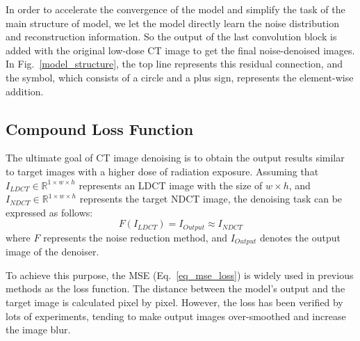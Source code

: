 \documentclass[conference]{IEEEtran}
\begin{document}
            In order to accelerate the convergence of the model and simplify the task of the main structure of model, we let the model directly learn the noise distribution and reconstruction information. 
            So the output of the last convolution block is added with the original low-dose CT image to get the final noise-denoised images.
            In Fig.~\ref{model_structure}, the top line represents this residual connection, and the symbol, which consists of a circle and a plus sign, represents the element-wise addition.

            \subsection{Compound Loss Function} \label{compound_loss_function}
                The ultimate goal of CT image denoising is to obtain the output results similar to target images with a higher dose of radiation exposure.
                Assuming that $I_{LDCT} \in \mathbb{R}^{1 \times w \times h}$ represents an LDCT image with the size of $w \times h$, and $I_{NDCT} \in \mathbb{R}^{1 \times w \times h}$ represents the target NDCT image, the denoising task can be expressed as follows:
                \begin{equation}
                    F(I_{LDCT}) = I_{Output} \approx I_{NDCT} \label{eq_task}
                \end{equation}
                where $F$ represents the noise reduction method, and $I_{Output}$ denotes the output image of the denoiser.

                To achieve this purpose, the MSE (Eq.~\ref{eq_mse_loss}) is widely used in previous methods as the loss function.
                The distance between the model's output and the target image is calculated pixel by pixel. 
                However, the loss has been verified by lots of experiments, tending to make output images over-smoothed and increase the image blur.
\end{document}
